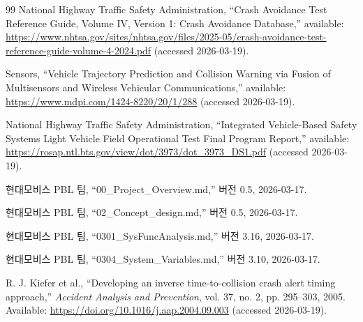 \documentclass[11pt,a4paper]{article}
\begin{document}
\begin{thebibliography}{99}
National Highway Traffic Safety Administration, ``Crash Avoidance Test Reference Guide, Volume IV, Version 1: Crash Avoidance Database,'' available: \url{https://www.nhtsa.gov/sites/nhtsa.gov/files/2025-05/crash-avoidance-test-reference-guide-volume-4-2024.pdf} (accessed 2026-03-19).

Sensors, ``Vehicle Trajectory Prediction and Collision Warning via Fusion of Multisensors and Wireless Vehicular Communications,'' available: \url{https://www.mdpi.com/1424-8220/20/1/288} (accessed 2026-03-19).

National Highway Traffic Safety Administration, ``Integrated Vehicle-Based Safety Systems Light Vehicle Field Operational Test Final Program Report,'' available: \url{https://rosap.ntl.bts.gov/view/dot/3973/dot_3973_DS1.pdf} (accessed 2026-03-19).

현대모비스 PBL 팀, ``00\_Project\_Overview.md,'' 버전 0.5, 2026-03-17.

현대모비스 PBL 팀, ``02\_Concept\_design.md,'' 버전 0.5, 2026-03-17.

현대모비스 PBL 팀, ``0301\_SysFuncAnalysis.md,'' 버전 3.16, 2026-03-17.

현대모비스 PBL 팀, ``0304\_System\_Variables.md,'' 버전 3.10, 2026-03-17.

R. J. Kiefer et al., ``Developing an inverse time-to-collision crash alert timing approach,'' \emph{Accident Analysis and Prevention}, vol. 37, no. 2, pp. 295--303, 2005. Available: \url{https://doi.org/10.1016/j.aap.2004.09.003} (accessed 2026-03-19).

\end{thebibliography}
\end{document}
